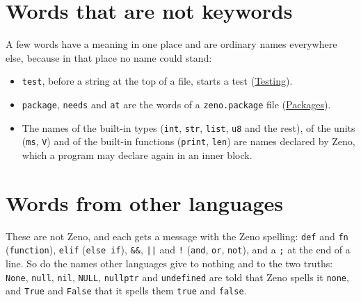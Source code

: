 \section*{Words that are not keywords}

A few words have a meaning in one place and are ordinary names
everywhere else, because in that place no name could stand:

\begin{itemize}
\item \verb|test|, before a string at the top of a file, starts a test
  (\hyperref[ch-testing]{Testing}).
\item \verb|package|, \verb|needs| and \verb|at| are the words of a
  \verb|zeno.package| file (\hyperref[ch-packages]{Packages}).
\item The names of the built-in types (\verb|int|, \verb|str|,
  \verb|list|, \verb|u8| and the rest), of the units (\verb|ms|,
  \verb|V|) and of the built-in functions (\verb|print|, \verb|len|)
  are names declared by Zeno, which a program may declare again in an
  inner block.
\end{itemize}

\section*{Words from other languages}

These are not Zeno, and each gets a message with the Zeno spelling:
\verb|def| and \verb|fn| (\verb|function|), \verb|elif|
(\verb|else if|), \verb|&&|, \verb+||+ and \verb|!| (\verb|and|,
\verb|or|, \verb|not|), and a \verb|;| at the end of a line. So do the names other languages
give to nothing and to the two truths: \verb|None|, \verb|null|,
\verb|nil|, \verb|NULL|, \verb|nullptr| and \verb|undefined| are
told that Zeno spells it \verb|none|, and \verb|True| and
\verb|False| that it spells them \verb|true| and \verb|false|.
